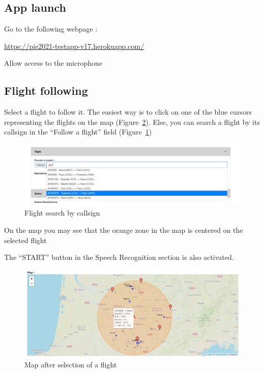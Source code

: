 \documentclass[12pt,oneside,a4]{article}
\let\tempone\itemize
\let\temptwo\enditemize
\renewenvironment{itemize}{\tempone\addtolength{\itemsep}{-0.5\baselineskip}}{\temptwo}
\newcommand{\linkdeploy}{https://pie2021-testapp-v17.herokuapp.com/}
\begin{document}
\subsection{App launch}
\begin{itemize}
    \item Go to the following webpage : 
    \begin{center}
        \vspace{-.4em}
        \url{\linkdeploy}
    \end{center}
    \item Allow access to the microphone
\end{itemize}

\subsection{Flight following}

\begin{itemize}
    \item Select a flight to follow it. The easiest way is to click on one of the blue cursors representing the flights on the map (Figure~\ref{fig:select_flight}). 
    Else, you can search a flight by its callsign in the ``Follow a flight'' field (Figure~\ref{fig:search_flight})
    \begin{figure}[h!]
        \centering
        \includegraphics[width=.98\linewidth]{search_flight.jpg}
        \caption{Flight search by callsign}
        \label{fig:search_flight}
    \end{figure}
    \item On the map you may see that the orange zone in the map is centered on the selected flight
    \item The ``START'' button in the Speech Recognition section is also activated.
\end{itemize}

\begin{figure}[h!]
    \centering
    \includegraphics[width=.98\linewidth]{select_flight.jpg}
    \caption{Map after selection of a flight}
    \label{fig:select_flight}
\end{figure}
\end{document}
